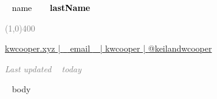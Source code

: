 \documentclass[11pt]{template3/cooperCV} %
\begin{document}
\begin{center}
\HUGE\textcolor{black}{~{{ name }}~}
\HUGE\textcolor{black}{\textbf{~{{ lastName }}~}}
\end{center}

\begin{center}
\textcolor{gray}{\line(1,0){400}}
\end{center}

\begin{center}
\footnotesize 
\href{https://kwcooper.xyz}{\faHome \hspace{0.05cm} kwcooper.xyz | \hspace{0.1cm}}
\href{mailto: ~{{ email }}~ }{\faEnvelope \hspace{0.05cm} ~{{ email }}~ | \hspace{0.1cm}} 
\href{https://github.com/kwcooper}{\faGithub \hspace{0.05cm} kwcooper | \hspace{0.1cm}}
\href{https://twitter.com/kwcooper}{\faTwitter \hspace{0.05cm} @keilandwcooper }  
\end{center}

\begin{center} \footnotesize \emph{\textcolor{gray}{Last updated ~{{ today }}~}} \end{center}
\vspace{0.7cm}




\begin{flushright}
\vspace{3.5mm}

\end{flushright}
\vspace{-18mm}

~{{ body }}~


\end{document}
